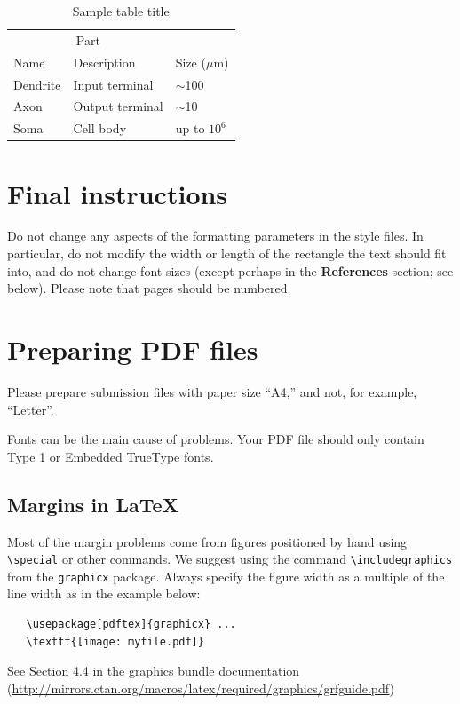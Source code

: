 \documentclass[a4paper]{article}
\begin{document}
\begin{table}
  \caption{Sample table title}
  \label{sample-table}
  \centering
  \begin{tabular}{lll}
    \toprule
    \multicolumn{2}{c}{Part}                   \\
    \cmidrule(r){1-2}
    Name     & Description     & Size ($\mu$m) \\
    \midrule
    Dendrite & Input terminal  & $\sim$100     \\
    Axon     & Output terminal & $\sim$10      \\
    Soma     & Cell body       & up to $10^6$  \\
    \bottomrule
  \end{tabular}
\end{table}


\section{Final instructions}


Do not change any aspects of the formatting parameters in the style files.  In
particular, do not modify the width or length of the rectangle the text should
fit into, and do not change font sizes (except perhaps in the
\textbf{References} section; see below). Please note that pages should be
numbered.


\section{Preparing PDF files}


Please prepare submission files with paper size ``A4,'' and not, for
example, ``Letter''.


Fonts can be the main cause of problems. Your PDF file should only
contain Type 1 or Embedded TrueType fonts.



\subsection{Margins in \LaTeX{}}


Most of the margin problems come from figures positioned by hand using
\verb+\special+ or other commands. We suggest using the command
\verb+\includegraphics+ from the \verb+graphicx+ package. Always specify the
figure width as a multiple of the line width as in the example below:
\begin{verbatim}
   \usepackage[pdftex]{graphicx} ...
   \texttt{[image: myfile.pdf]}
\end{verbatim}
See Section 4.4 in the graphics bundle documentation
(\url{http://mirrors.ctan.org/macros/latex/required/graphics/grfguide.pdf})
\end{document}

